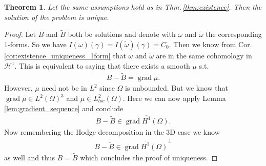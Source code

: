 \documentclass[12pt,a4paper]{article}
\numberwithin{equation}{subsection}
\numberwithin{lemma}{subsection}
\newtheorem{theorem}[lemma]{Theorem}
\theoremstyle{definition}
\DeclareMathOperator{\grad}{grad}
\newcommand{\rop}{\mathscr{R}} %
\begin{document}
\begin{theorem}
    Let the same assumptions hold as in Thm.\,\ref{thm:existence}.
    Then the solution of the problem is unique.
\end{theorem}

\begin{proof}
    Let $B$ and $\tilde{B}$ both be solutions and denote with $\omega$ 
    and $\tilde{\omega}$ the corresponding $1$-forms. 
    So we have $I(\omega)(\gamma) = I(\tilde{\omega})(\gamma) = C_0$.
    Then we know from Cor.\,\ref{cor:existence_uniqueness_1form} 
    that $\omega$ and $\tilde{\omega}$ are in the 
    same cohomology in $\mathcal{H}^1$. This is equivalent to saying that 
    there exists a smooth $\mu$ s.t. 
    \begin{align*}
        B - \tilde{B} = \grad \mu.
    \end{align*}
    However, $\mu$ need not be in $L^2$ since $\Omega$ is unbounded.
    But we know that $\grad \mu \in L^2(\Omega)^3$ and 
    $\mu \in L^2_{loc}(\Omega)$. 
    Here we can now apply Lemma \ref{lem:gradient_sequence} and conclude
    \begin{align*}
        B - \tilde{B} \in \overline{\grad H^1(\Omega)}.
    \end{align*}
    Now remembering the Hodge decomposition in the 3D case we know 
    \begin{align*}
        B - \tilde{B} \in \overline{\grad H^1(\Omega)}^\perp
    \end{align*}
    as well and thus $B = \tilde{B}$ which concludes the proof of uniqueness.
\end{proof}


    
\end{document}
